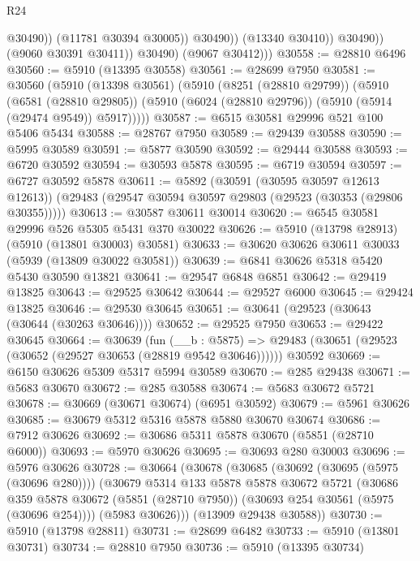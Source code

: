 \begin{lexlean}{R24}
\begin{coremodule}
                            @30490))
                        (@11781 @30394 @30005))
                      @30490))
                  (@13340 @30410))
                @30490))
            (@9060 @30391 @30411))
          @30490)
        (@9067 @30412)))
@30558 := @28810 @6496
@30560 := @5910 (@13395 @30558)
@30561 := @28699 @7950
@30581 := @30560
    (@5910
      (@13398 @30561)
      (@5910
        (@8251 (@28810 @29799))
        (@5910
          (@6581 (@28810 @29805))
          (@5910 (@6024 (@28810 @29796)) (@5910 (@5914 (@29474 @9549)) @5917)))))
@30587 := @6515 @30581 @29996 @521 @100 @5406 @5434
@30588 := @28767 @7950
@30589 := @29439 @30588
@30590 := @5995 @30589
@30591 := @5877 @30590
@30592 := @29444 @30588
@30593 := @6720 @30592
@30594 := @30593 @5878
@30595 := @6719 @30594
@30597 := @6727 @30592 @5878
@30611 := @5892
    (@30591 (@30595 @30597 @12613 @12613))
    (@29483 (@29547 @30594 @30597 @29803 (@29523 (@30353 (@29806 @30355)))))
@30613 := @30587 @30611 @30014
@30620 := @6545 @30581 @29996 @526 @5305 @5431 @370 @30022
@30626 := @5910 (@13798 @28913) (@5910 (@13801 @30003) @30581)
@30633 := @30620 @30626 @30611 @30033 (@5939 (@13809 @30022 @30581))
@30639 := @6841 @30626 @5318 @5420 @5430 @30590 @13821
@30641 := @29547 @6848 @6851
@30642 := @29419 @13825
@30643 := @29525 @30642
@30644 := @29527 @6000
@30645 := @29424 @13825
@30646 := @29530 @30645
@30651 := @30641 (@29523 (@30643 (@30644 (@30263 @30646))))
@30652 := @29525 @7950
@30653 := @29422 @30645
@30664 := @30639
    (fun (__b : @5875) => @29483 (@30651 (@29523 (@30652 (@29527 @30653 (@28819 @9542 @30646))))))
    @30592
@30669 := @6150 @30626 @5309 @5317 @5994 @30589
@30670 := @285 @29438
@30671 := @5683 @30670
@30672 := @285 @30588
@30674 := @5683 @30672 @5721
@30678 := @30669 (@30671 @30674) (@6951 @30592)
@30679 := @5961 @30626
@30685 := @30679 @5312 @5316 @5878 @5880 @30670 @30674
@30686 := @7912 @30626
@30692 := @30686 @5311 @5878 @30670 (@5851 (@28710 @6000))
@30693 := @5970 @30626
@30695 := @30693 @280 @30003
@30696 := @5976 @30626
@30728 := @30664
    (@30678
      (@30685
        (@30692 (@30695 (@5975 (@30696 @280))))
        (@30679
          @5314
          @133
          @5878
          @5878
          @30672
          @5721
          (@30686
            @359
            @5878
            @30672
            (@5851 (@28710 @7950))
            (@30693 @254 @30561 (@5975 (@30696 @254))))
          (@5983 @30626)))
      (@13909 @29438 @30588))
@30730 := @5910 (@13798 @28811)
@30731 := @28699 @6482
@30733 := @5910 (@13801 @30731)
@30734 := @28810 @7950
@30736 := @5910 (@13395 @30734)

\end{coremodule}
\end{lexlean}
